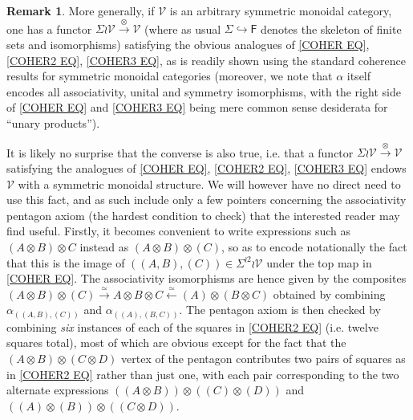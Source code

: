 \documentclass[a4paper,10pt
,draft
]{article}%
\numberwithin{equation}{section}
\numberwithin{figure}{section}
\theoremstyle{definition} %
\newtheorem{remark}[equation]{Remark}%
\newcommand{\Fin}{\mathsf{F}}%
\newcommand{\1}{\ensuremath{\mathbbm 1}}%
\begin{document}
\begin{remark}
\label{SIGMA_WR_REM}
More generally, if $\mathcal{V}$ is an arbitrary
symmetric monoidal category, one has a functor 
$\Sigma \wr \mathcal{V} \xrightarrow{\otimes} \mathcal{V}$
(where as usual $\Sigma \hookrightarrow \Fin$ denotes the skeleton of finite sets and isomorphisms) satisfying the obvious analogues of
\eqref{COHER EQ}, \eqref{COHER2 EQ}, \eqref{COHER3 EQ},
as is readily shown using the standard coherence results for symmetric monoidal categories 
(moreover, we note that $\alpha$ itself encodes all associativity, unital and symmetry isomorphisms, with the 
right side of \eqref{COHER EQ} and \eqref{COHER3 EQ}
being mere common sense desiderata for ``unary products'').

It is likely no surprise that the converse is also true, i.e. 
that a functor 
$\Sigma \wr \mathcal{V} \xrightarrow{\otimes} \mathcal{V}$
satisfying the analogues of 
\eqref{COHER EQ}, \eqref{COHER2 EQ}, \eqref{COHER3 EQ}
endows $\mathcal{V}$ with a symmetric monoidal structure.
We will however have no direct need to use this fact, and as such include only a few pointers concerning the associativity pentagon axiom (the hardest condition to check) that the interested reader may find useful. 
Firstly, it becomes convenient to write expressions such as
$(A \otimes B) \otimes C$ instead as 
$(A \otimes B) \otimes (C)$, so as to encode notationally the fact that this is the image of 
$((A,B),(C)) \in \Sigma^{\wr 2} \wr \mathcal{V}$ under the top map in \eqref{COHER EQ}. The associativity isomorphisms are hence given by the composites
$
(A \otimes B) \otimes (C) \xrightarrow{\simeq} 
A \otimes B \otimes C \xleftarrow{\simeq}
(A) \otimes (B \otimes C)
$
obtained by combining 
$\alpha_{((A,B),(C))}$ 
and
$\alpha_{((A),(B,C))}$.
The pentagon axiom is then checked by combining \textit{six} instances of each of the squares in \eqref{COHER2 EQ} 
(i.e. twelve squares total), most of which are obvious except for the fact that the $(A\otimes B) \otimes (C \otimes D)$ vertex of the pentagon contributes two pairs of squares 
as in \eqref{COHER2 EQ} rather than just one, 
with each pair corresponding to the two alternate expressions 
$((A \otimes B)) \otimes ((C) \otimes (D))$ and 
$((A) \otimes (B)) \otimes ((C \otimes D))$.
\end{remark}

\end{document}

